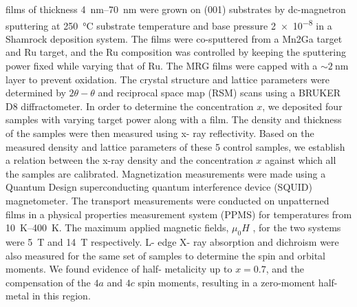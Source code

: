 \documentclass[reprint,aip,apl,floatfix,linenumbers,superscriptaddress]{revtex4-1}
\begin{document}
 films of thickness \SIrange{4}{70}{\nano\metre} were grown on  (001) substrates by dc-magnetron sputtering at \SI{250}{\celsius} 
substrate temperature and base pressure \SI{2e-8}{\torr} in a Shamrock 
deposition system. The films were co-sputtered from a Mn2Ga target and Ru 
target, and the Ru composition was controlled by keeping the  
sputtering power fixed while varying that of Ru. The MRG films were capped 
with a  $\sim \SI{2 }{\nano\metre}$  layer to prevent oxidation.  
The crystal structure and lattice parameters were determined by $2\theta-
\theta$ and reciprocal space map (RSM) scans using a BRUKER D8 
diffractometer. In order to determine the  concentration $x$, we 
deposited four samples with varying  target power along with a  film. The density and thickness of the samples were then measured using x-
ray reflectivity. Based on the measured density and lattice parameters of 
these 5 control samples, we establish a relation between the x-ray density 
and the  concentration $x$ against which all the samples are 
calibrated. Magnetization measurements were made using a Quantum Design 
superconducting quantum interference device (SQUID) magnetometer. The 
transport measurements were conducted on unpatterned  films in a 
physical properties measurement system (PPMS) for temperatures from \SIrange{
10}{400}{\kelvin}. The maximum applied magnetic fields, $\mu_0H$ , for the 
two systems were \SI{5}{\tesla} and \SI{14}{\tesla} respectively. L- edge X-
ray absorption and dichroism were also measured for the same set of samples 
to determine the spin and orbital moments. We found evidence of half- 
metalicity up to $x=0.7$, and the compensation of the  $4a$ and $4c$ 
spin moments, resulting in a zero-moment half-metal in this region. \cite{
Betto2014}

\end{document}

